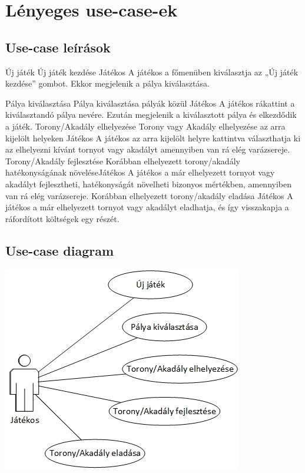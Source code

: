 \section{Lényeges use-case-ek}
\subsection{Use-case leírások}


\usecase
{Új játék}
{Új játék kezdése}
{Játékos}
{A játékos a főmenüben kiválasztja az „Új játék kezdése” gombot. Ekkor megjelenik a pálya kiválasztása.}

\usecase
{Pálya kiválasztása
}{Pálya kiválasztása pályák közül}
{Játékos}
{A játékos rákattint a kiválasztandó pálya nevére. Ezután megjelenik a kiválasztott pálya és elkezdődik a játék.}
\usecase
{Torony/Akadály elhelyezése}
{Torony vagy Akadály elhelyezése az arra kijelölt helyeken}
{Játékos}
{A játékos az arra kijelölt helyre kattintva választhatja ki az elhelyezni kívánt tornyot vagy akadályt amennyiben van rá elég varázsereje. }
\usecase
{Torony/Akadály fejlesztése}
{Korábban elhelyezett torony/akadály hatékonyságának növelése}{Játékos}
{A játékos a már elhelyezett tornyot vagy akadályt fejlesztheti, hatékonyságát növelheti bizonyos mértékben, amennyiben van rá elég varázsereje.}
{Korábban elhelyezett torony/akadály eladása}
{Játékos}
{A játékos a már elhelyezett tornyot vagy akadályt eladhatja, és így visszakapja a ráfordított költségek egy részét.}
\subsection{Use-case diagram}
\centerline
{\includegraphics{./chapters/chapter02/images/2_4_2_use_case_diagram.jpg}}
%




